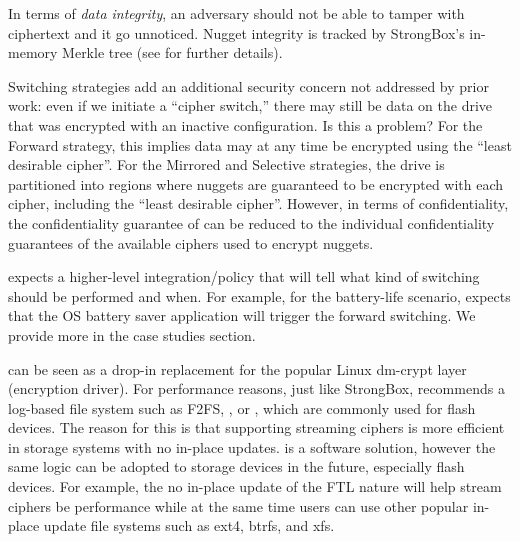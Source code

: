 In terms of {\em data integrity}, an adversary should not be able to tamper with
ciphertext and it go unnoticed. Nugget integrity is tracked by StrongBox's
in-memory Merkle tree (see \cite[Section \xxx]{StrongBox} for further details).

Switching strategies add an additional security concern not addressed by prior
work: even if we initiate a ``cipher switch,'' there may still be data on the
drive that was encrypted with an inactive configuration. Is this a problem? For
the Forward strategy, this implies data may at any time be encrypted using the
``least desirable cipher''. For the Mirrored and Selective strategies, the drive
is partitioned into regions where nuggets are guaranteed to be encrypted with
each cipher, including the ``least desirable cipher''. However, in terms of
confidentiality, the confidentiality guarantee of \sys can be reduced to the
individual confidentiality guarantees of the available ciphers used to encrypt
nuggets. 

 \sys expects a higher-level integration/policy
that will tell \sys what kind of switching should be performed and when. For
example, for the battery-life scenario, \sys expects that the OS battery saver
application will trigger the forward switching. We provide more in the case
studies section.

 \sys can be seen as a drop-in replacement for the popular
Linux dm-crypt layer (encryption driver). For performance reasons, just like
StrongBox, \sys recommends a log-based file system such as F2FS, \xxx, or \xxx,
which are commonly used for flash devices. The reason for this is that
supporting streaming ciphers is more efficient in storage systems with no
in-place updates. \sys is a software solution, however the same logic can be
adopted to storage devices in the future, especially flash devices. For example,
the no in-place update of the FTL nature will help stream ciphers be performance
while at the same time users can use other popular in-place update file systems
such as ext4, btrfs, and xfs.
